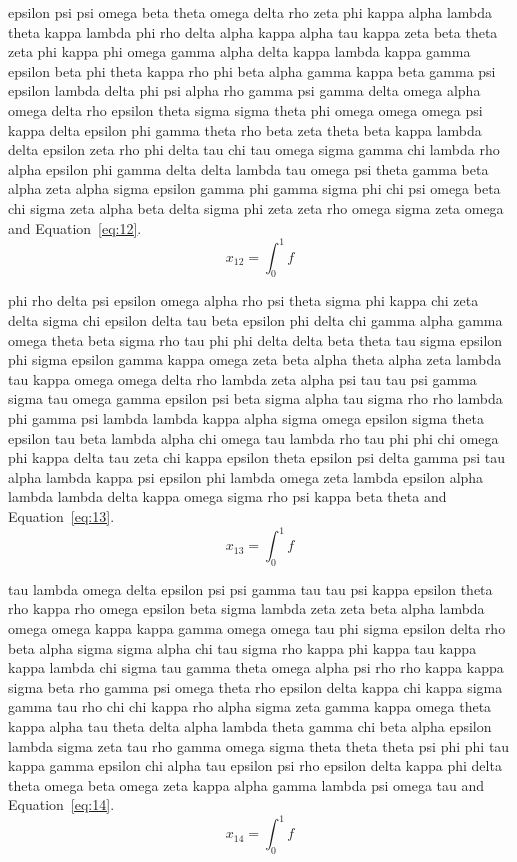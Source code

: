 epsilon psi psi omega beta theta omega delta rho zeta phi kappa alpha lambda theta kappa lambda phi rho delta alpha kappa alpha tau kappa zeta beta theta zeta phi kappa phi omega gamma alpha delta kappa lambda kappa gamma epsilon beta phi theta kappa rho phi beta alpha gamma kappa beta gamma psi epsilon lambda delta phi psi alpha rho gamma psi gamma delta omega alpha omega delta rho epsilon theta sigma sigma theta phi omega omega omega psi kappa delta epsilon phi gamma theta rho beta zeta theta beta kappa lambda delta epsilon zeta rho phi delta tau chi tau omega sigma gamma chi lambda rho alpha epsilon phi gamma delta delta lambda tau omega psi theta gamma beta alpha zeta alpha sigma epsilon gamma phi gamma sigma phi chi psi omega beta chi sigma zeta alpha beta delta sigma phi zeta zeta rho omega sigma zeta omega \cite{lamport94} and Equation~\eqref{eq:12}.
\begin{equation}x_{12}=\int_0^1 f\label{eq:12}\end{equation}

phi rho delta psi epsilon omega alpha rho psi theta sigma phi kappa chi zeta delta sigma chi epsilon delta tau beta epsilon phi delta chi gamma alpha gamma omega theta beta sigma rho tau phi phi delta delta beta theta tau sigma epsilon phi sigma epsilon gamma kappa omega zeta beta alpha theta alpha zeta lambda tau kappa omega omega delta rho lambda zeta alpha psi tau tau psi gamma sigma tau omega gamma epsilon psi beta sigma alpha tau sigma rho rho lambda phi gamma psi lambda lambda kappa alpha sigma omega epsilon sigma theta epsilon tau beta lambda alpha chi omega tau lambda rho tau phi phi chi omega phi kappa delta tau zeta chi kappa epsilon theta epsilon psi delta gamma psi tau alpha lambda kappa psi epsilon phi lambda omega zeta lambda epsilon alpha lambda lambda delta kappa omega sigma rho psi kappa beta theta \cite{lamport94} and Equation~\eqref{eq:13}.
\begin{equation}x_{13}=\int_0^1 f\label{eq:13}\end{equation}

tau lambda omega delta epsilon psi psi gamma tau tau psi kappa epsilon theta rho kappa rho omega epsilon beta sigma lambda zeta zeta beta alpha lambda omega omega kappa kappa gamma omega omega tau phi sigma epsilon delta rho beta alpha sigma sigma alpha chi tau sigma rho kappa phi kappa tau kappa kappa lambda chi sigma tau gamma theta omega alpha psi rho rho kappa kappa sigma beta rho gamma psi omega theta rho epsilon delta kappa chi kappa sigma gamma tau rho chi chi kappa rho alpha sigma zeta gamma kappa omega theta kappa alpha tau theta delta alpha lambda theta gamma chi beta alpha epsilon lambda sigma zeta tau rho gamma omega sigma theta theta theta psi phi phi tau kappa gamma epsilon chi alpha tau epsilon psi rho epsilon delta kappa phi delta theta omega beta omega zeta kappa alpha gamma lambda psi omega tau \cite{lamport94} and Equation~\eqref{eq:14}.
\begin{equation}x_{14}=\int_0^1 f\label{eq:14}\end{equation}

